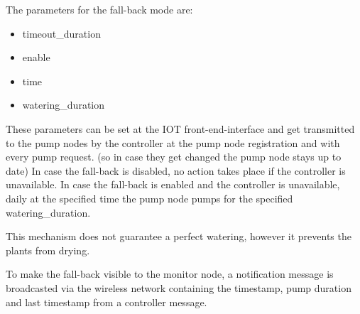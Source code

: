 The parameters for the fall-back mode are:
\begin{itemize}
\item timeout\_duration
\item enable
\item time
\item watering\_duration
\end{itemize}

These parameters can be set at the IOT front-end-interface and get transmitted to the pump nodes by the controller at the pump node registration and with every pump request. (so in case they get changed the pump node stays up to date)
In case the fall-back is disabled, no action takes place if the controller is unavailable.
In case the fall-back is enabled and the controller is unavailable, daily at the specified time the pump node pumps for the specified watering\_duration.

This mechanism does not guarantee a perfect watering, however it prevents the plants from drying.

To make the fall-back visible to the monitor node, a notification message is broadcasted via the wireless network containing the timestamp, pump duration and last timestamp from a controller message.